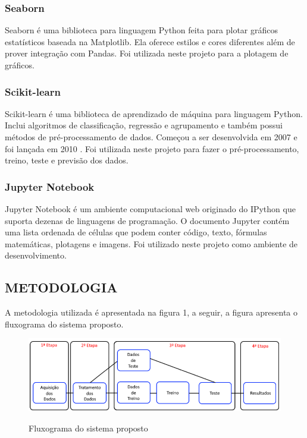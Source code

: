 \subsubsection{Seaborn}
	Seaborn é uma biblioteca para linguagem Python feita para plotar gráficos estatísticos baseada na Matplotlib. Ela oferece estilos e cores diferentes além de prover integração com Pandas. Foi utilizada neste projeto para a plotagem de gráficos.
	
\subsubsection{Scikit-learn}
	Scikit-learn é uma biblioteca de aprendizado de máquina para linguagem Python. Inclui algoritmos de classificação, regressão e agrupamento e também possui métodos de pré-processamento de dados. Começou a ser desenvolvida em 2007 e foi lançada em 2010 \cite{scikit-learn}. Foi utilizada neste projeto para fazer o pré-processamento, treino, teste e previsão dos dados.
	
\subsubsection{Jupyter Notebook}
	Jupyter Notebook é um ambiente computacional web originado do IPython que suporta dezenas de linguagens de programação. O documento Jupyter contém uma lista ordenada de células que podem conter código, texto, fórmulas matemáticas, plotagens e imagens. Foi utilizado neste projeto como ambiente de desenvolvimento.

\subsection{METODOLOGIA}
A metodologia utilizada é apresentada na figura 1, a seguir, a figura apresenta o fluxograma do sistema proposto.

\begin{figure}[htbp]
  \begin{center}
  \includegraphics[width=1.\linewidth]{imagens/fluxograma.png}\\
  \end{center}
  \caption[Fluxograma do sistema proposto]{Fluxograma do sistema proposto}
  \label{fig:logo}
\end{figure}

